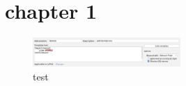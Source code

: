 \section{chapter 1}

\begin{figure}
    \centering
    \includegraphics[width=0.5\textwidth]{images/not-an-image.png}
    \caption{test}
    \label{fig:test}
\end{figure}